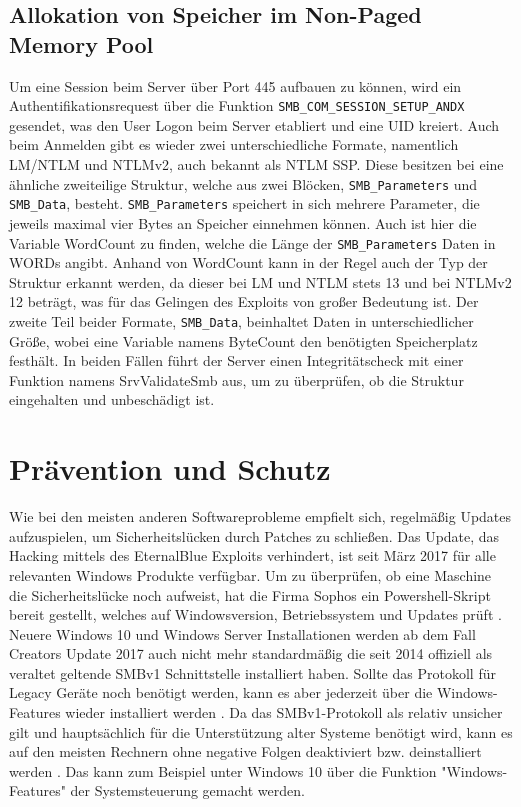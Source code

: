 \documentclass[DIV=12,headings=normal,pdftex,headinclude=false,footinclude=false,final]{scrreprt}
\begin{document}
\section{Allokation von Speicher im Non-Paged Memory Pool}
Um eine Session beim Server über Port 445 aufbauen zu können, wird ein Authentifikationsrequest über die Funktion \verb|SMB_COM_SESSION_SETUP_ANDX| gesendet, was den User Logon beim Server etabliert und eine UID kreiert. Auch beim Anmelden gibt es wieder zwei unterschiedliche Formate, namentlich LM/NTLM und NTLMv2, auch bekannt als NTLM SSP. Diese besitzen bei eine ähnliche zweiteilige Struktur, welche aus zwei Blöcken, \verb|SMB_Parameters| und \verb|SMB_Data|, besteht.
\verb|SMB_Parameters| speichert in sich mehrere Parameter, die jeweils maximal vier Bytes an Speicher einnehmen können. Auch ist hier die Variable WordCount zu finden, welche die Länge der \verb|SMB_Parameters| Daten in WORDs angibt. Anhand von WordCount kann in der Regel auch der Typ der Struktur erkannt werden, da dieser bei LM und NTLM stets 13 und bei NTLMv2 12 beträgt, was für das Gelingen des Exploits von großer Bedeutung ist.
Der zweite Teil beider Formate, \verb|SMB_Data|, beinhaltet Daten in unterschiedlicher Größe, wobei eine Variable namens ByteCount den benötigten Speicherplatz festhält. In beiden Fällen führt der Server einen Integritätscheck mit einer Funktion namens SrvValidateSmb aus, um zu überprüfen, ob die Struktur eingehalten und unbeschädigt ist.

\chapter{Prävention und Schutz}
Wie bei den meisten anderen Softwareprobleme empfielt sich, regelmäßig Updates aufzuspielen, um Sicherheitslücken durch Patches zu schließen. Das Update, das Hacking mittels des EternalBlue Exploits verhindert, ist seit März 2017 für alle relevanten Windows Produkte verfügbar.
Um zu überprüfen, ob eine Maschine die Sicherheitslücke noch aufweist, hat die Firma Sophos ein Powershell-Skript bereit gestellt, welches auf Windowsversion, Betriebssystem und Updates prüft \cite{SAV}.
Neuere Windows 10 und Windows Server Installationen werden ab dem Fall Creators Update 2017 auch nicht mehr standardmäßig die seit 2014 offiziell als veraltet geltende SMBv1 Schnittstelle installiert haben. Sollte das Protokoll für Legacy Geräte noch benötigt werden, kann es aber jederzeit über die Windows-Features wieder installiert werden \cite{MS:Fix}.
Da das SMBv1-Protokoll als relativ unsicher gilt und hauptsächlich für die Unterstützung alter Systeme benötigt wird, kann es auf den meisten Rechnern ohne negative Folgen deaktiviert bzw. deinstalliert werden \cite{WP}. Das kann zum Beispiel unter Windows 10 über die Funktion "Windows-Features" der Systemsteuerung gemacht werden.

\clearpage
\label{sec:literatur}
\renewcommand{\bibname}{Quellenverzeichnis}


\end{document}
